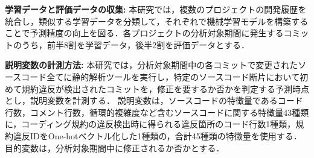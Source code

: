 \documentclass[T,J]{fose} %
\begin{document}

\noindent\textbf{学習データと評価データの収集: }本研究では，複数のプロジェクトの開発履歴を統合し，類似する学習データを分類して，それぞれで機械学習モデルを構築することで予測精度の向上を図る．各プロジェクトの分析対象期間に発生するコミットのうち，前半8割を学習データ，後半2割を評価データとする．%





\noindent\textbf{説明変数の計測方法: }本研究では，分析対象期間中の各コミットで変更されたソースコード全てに静的解析ツールを実行し，特定のソースコード断片において初めて規約違反が検出されたコミットを，修正を要するか否かを判定する予測時点とし，説明変数を計測する．
説明変数は，ソースコードの特徴量であるコード行数，コメント行数，循環的複雑度など含むソースコードに関する特徴量43種類に，コーディング規約の違反検出時に得られる違反箇所のコード行数1種類，規約違反IDをOne-hotベクトル化した1種類の，合計45種類の特徴量を使用する．目的変数は，分析対象期間中に修正されるか否かとする．
\end{document}
